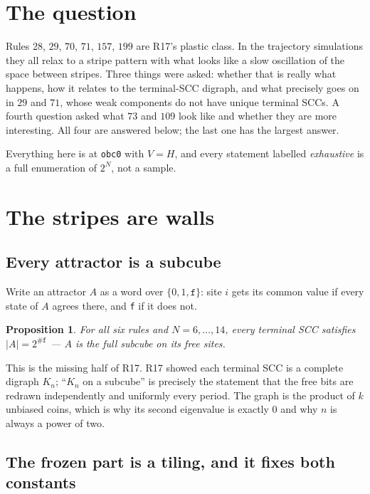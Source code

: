 \documentclass[11pt]{article}
\newcommand{\rt}[1]{\texttt{#1}}
\theoremstyle{plain}
\newtheorem{proposition}{Proposition}
\begin{document}
\tableofcontents

\section{The question}

Rules $28$, $29$, $70$, $71$, $157$, $199$ are R17's plastic class. In the
trajectory simulations they all relax to a stripe pattern with what looks like a
slow oscillation of the space between stripes. Three things were asked: whether
that is really what happens, how it relates to the terminal-SCC digraph, and what
precisely goes on in $29$ and $71$, whose weak components do not have unique
terminal SCCs. A fourth question asked what $73$ and $109$ look like and whether
they are more interesting. All four are answered below; the last one has the
largest answer.

Everything here is at \rt{obc0} with $V=H$, and every statement labelled
\emph{exhaustive} is a full enumeration of $2^N$, not a sample.

\section{The stripes are walls}

\subsection{Every attractor is a subcube}

Write an attractor $A$ as a word over $\{0,1,\rt{f}\}$: site $i$ gets its common
value if every state of $A$ agrees there, and \rt{f} if it does not.

\begin{proposition}
For all six rules and $N=6,\dots,14$, every terminal SCC satisfies
$|A| = 2^{\#\rt{f}}$ --- $A$ is the full subcube on its free sites.
\end{proposition}

\noindent This is the missing half of R17. R17 showed each terminal SCC is a
complete digraph $K_n$; ``$K_n$ on a subcube'' is precisely the statement that
the free bits are redrawn independently and uniformly every period. The graph is
the product of $k$ unbiased coins, which is why its second eigenvalue is exactly
$0$ and why $n$ is always a power of two.

\subsection{The frozen part is a tiling, and it fixes both constants}
\end{document}
